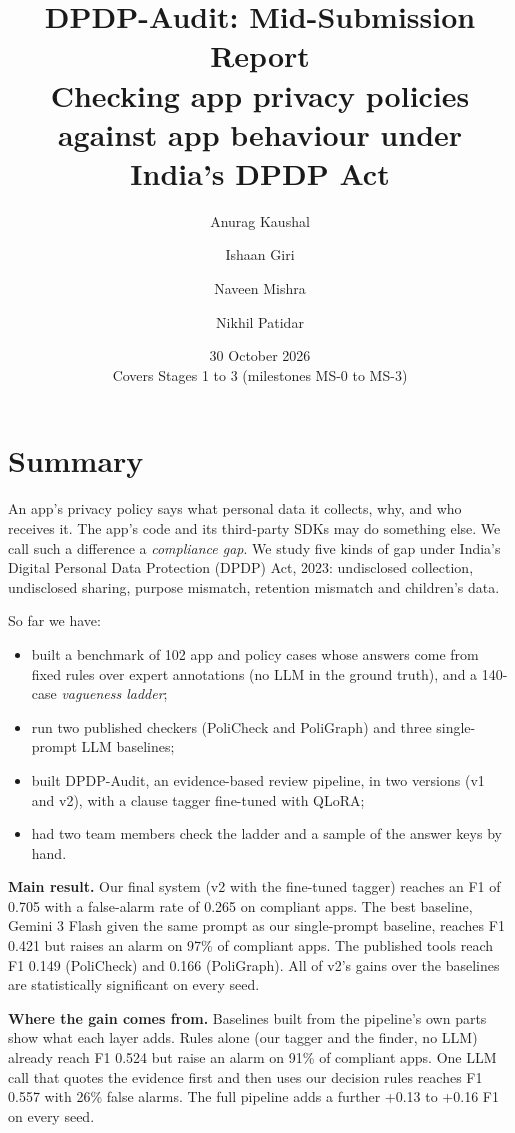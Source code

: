 \documentclass[11pt,a4paper]{article}
\title{DPDP-Audit: Mid-Submission Report\\[2pt]
\large Checking app privacy policies against app behaviour under India's DPDP Act}
\author{Anurag Kaushal \and Ishaan Giri \and Naveen Mishra \and Nikhil Patidar}
\date{30 October 2026\\[2pt] Covers Stages 1 to 3 (milestones MS-0 to MS-3)}
\begin{document}
\maketitle

\section{Summary}

An app's privacy policy says what personal data it collects, why, and who receives it. The app's
code and its third-party SDKs may do something else. We call such a difference a \emph{compliance
gap}. We study five kinds of gap under India's Digital Personal Data Protection (DPDP) Act, 2023:
undisclosed collection, undisclosed sharing, purpose mismatch, retention mismatch and children's
data.

So far we have:
\begin{itemize}
  \item built a benchmark of 102 app and policy cases whose answers come from fixed rules over
        expert annotations (no LLM in the ground truth), and a 140-case \emph{vagueness ladder};
  \item run two published checkers (PoliCheck and PoliGraph) and three single-prompt LLM baselines;
  \item built DPDP-Audit, an evidence-based review pipeline, in two versions (v1 and v2), with a
        clause tagger fine-tuned with QLoRA;
  \item had two team members check the ladder and a sample of the answer keys by hand.
\end{itemize}

\textbf{Main result.} Our final system (v2 with the fine-tuned tagger) reaches an F1 of 0.705 with a
false-alarm rate of 0.265 on compliant apps. The best baseline, Gemini 3 Flash given the same prompt
as our single-prompt baseline, reaches F1 0.421 but raises an alarm on 97\% of compliant apps. The
published tools reach F1 0.149 (PoliCheck) and 0.166 (PoliGraph). All of v2's gains over the
baselines are statistically significant on every seed.

\textbf{Where the gain comes from.} Baselines built from the pipeline's own parts show what each
layer adds. Rules alone (our tagger and the finder, no LLM) already reach F1 0.524 but raise an
alarm on 91\% of compliant apps. One LLM call that quotes the evidence first and then uses our
decision rules reaches F1 0.557 with 26\% false alarms. The full pipeline adds a further +0.13 to
+0.16 F1 on every seed.
\end{document}
